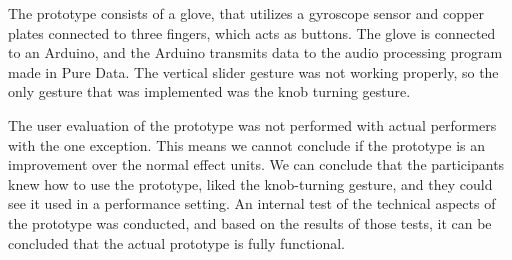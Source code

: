 The prototype consists of a glove, that utilizes a gyroscope sensor and copper plates connected to three fingers, which acts as buttons. The glove is connected to an Arduino, and the Arduino transmits data to the audio processing program made in Pure Data. The vertical slider gesture was not working properly, so the only gesture that was implemented was the knob turning gesture.

The user evaluation of the prototype was not performed with actual performers with the one exception. This means we cannot conclude if the prototype is an improvement over the normal effect units. We can conclude that the participants knew how to use the prototype, liked the knob-turning gesture, and they could see it used in a performance setting. An internal test of the technical aspects of the prototype was conducted, and based on the results of those tests, it can be concluded that the actual prototype is fully functional.